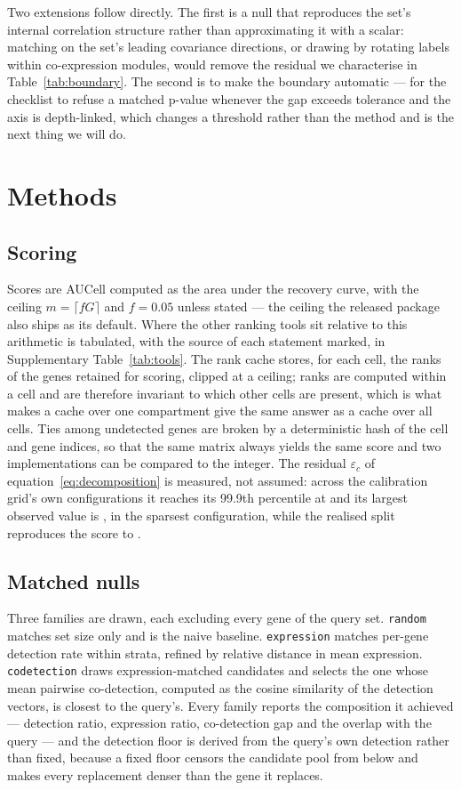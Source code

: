 \documentclass[11pt]{article}
\newcommand{\code}[1]{\texttt{#1}}
\begin{document}
Two extensions follow directly. The first is a null that reproduces the set's
internal correlation structure rather than approximating it with a scalar:
matching on the set's leading covariance directions, or drawing by rotating
labels within co-expression modules, would remove the residual we characterise
in Table~\ref{tab:boundary}. The second is to make the boundary automatic ---
for the checklist to refuse a matched p-value whenever the gap exceeds
tolerance and the axis is depth-linked, which changes a threshold rather than
the method and is the next thing we will do.

\section{Methods}

\subsection{Scoring}
Scores are AUCell \citep{aibar2017} computed as the area under the recovery
curve, with the ceiling $m=\lceil fG\rceil$ and $f=0.05$ unless stated --- the
ceiling the released package also ships as its default. Where the other
ranking tools sit relative to this arithmetic is tabulated, with the source
of each statement marked, in Supplementary Table~\ref{tab:tools}. The
rank cache stores, for each cell, the ranks of the genes retained for scoring,
clipped at a ceiling; ranks are computed within a cell and are therefore
invariant to which other cells are present, which is what makes a cache over one
compartment give the same answer as a cache over all cells. Ties among
undetected genes are broken by a deterministic hash of the cell and gene
indices, so that the same matrix always yields the same score and two
implementations can be compared to the integer. The residual
$\varepsilon_c$ of equation~\eqref{eq:decomposition} is measured, not
assumed: across the calibration grid's own configurations it reaches its
99.9th percentile at \residTailAbs{} and its largest observed value is
\residMaxAbs, in the sparsest configuration, while the realised split
reproduces the score to \residExactGap.

\subsection{Matched nulls}
Three families are drawn, each excluding every gene of the query set.
\code{random} matches set size only and is the naive baseline.
\code{expression} matches per-gene detection rate within strata, refined by
relative distance in mean expression. \code{codetection} draws expression-matched
candidates and selects the one whose mean pairwise co-detection, computed as the
cosine similarity of the detection vectors, is closest to the query's.
Every family reports the composition it achieved --- detection ratio, expression
ratio, co-detection gap and the overlap with the query --- and the detection
floor is derived from the query's own detection rather than fixed, because a
fixed floor censors the candidate pool from below and makes every replacement
denser than the gene it replaces.
\end{document}
